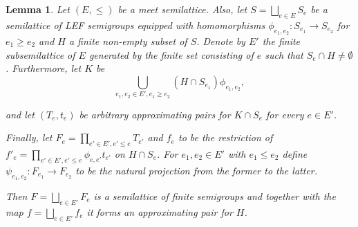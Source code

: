 \documentclass{article}
\newtheorem{lemma}{Lemma}
\theoremstyle{definition}
\begin{document}
\begin{lemma}\label{lem_semlef}
Let $(E, \le)$ be a meet semilattice. Also, let $S = \bigsqcup\limits_{e\in E} S_e$ be a semilattice of LEF semigroups equipped with homomorphisms $\phi_{e_1,e_2}: S_{e_1}\rightarrow S_{e_2}$ for $e_1 \ge e_2$ and $H$ a finite non-empty subset of $S$. Denote by $E'$ the finite subsemilattice of $E$ generated by the finite set consisting of $e$ such that $S_e \cap H \neq \emptyset$. Furthermore, let $K$ be $$\bigcup\limits_{e_1, e_2 \in E', e_1 \ge e_2}  (H \cap S_{e_1})\phi_{e_1,e_2},$$

and let $(T_e, t_e)$ be arbitrary approximating pairs for $K \cap S_e$ for every $e \in E'$.

Finally, let $F_e = \prod\limits_{e' \in E', e' \le e} T_{e'}$ and $f_e$ to be the restriction of $f'_e = \prod\limits_{e' \in E', e' \le e} \phi_{e,e'} t_{e'} $ on $H \cap S_e$. For $e_1, e_2 \in E'$ with $e_1 \le e_2$ define $\psi_{e_1,e_2}: F_{e_1}\rightarrow F_{e_2}$ to be the natural projection from the former to the latter.

Then $F = \bigsqcup\limits_{e\in E'} F_e$ is a semilattice of finite semigroups and together with the map $f = \bigsqcup\limits_{e\in E'} f_e$ it forms an approximating pair for $H$.

\end{lemma}
\end{document}

